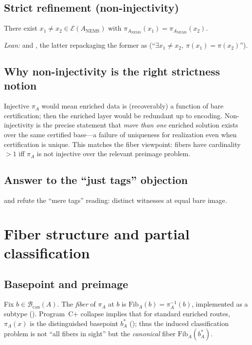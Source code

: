 \documentclass[11pt]{article}
\begin{document}
\subsection{Strict refinement (non-injectivity)}\label{sec:strict-refinement-thm}
\begin{theorem}\label{thm:strict-refinement}
There exist $x_1 \neq x_2 \in \mathcal{E}(A_{\mathrm{NEMS}})$ with $\pi_{A_{\mathrm{NEMS}}}(x_1) = \pi_{A_{\mathrm{NEMS}}}(x_2)$.
\end{theorem}

\noindent\emph{Lean:}  and , the latter repackaging the former as  (``$\exists x_1 \neq x_2,\ \pi(x_1)=\pi(x_2)$'').

\subsection{Why non-injectivity is the right strictness notion}\label{sec:strict-refinement-why}
Injective $\pi_A$ would mean enriched data is (recoverably) a function of bare certification; then the enriched layer would be redundant up to encoding. Non-injectivity is the precise statement that \emph{more than one} enriched solution exists over the same certified base---a failure of uniqueness for realization even when certification is unique. This matches the fiber viewpoint: fibers have cardinality $>1$ iff $\pi_A$ is not injective over the relevant preimage problem.

\subsection{Answer to the ``just tags'' objection}\label{sec:strict-refinement-meaning}
 and  refute the ``mere tags'' reading: distinct witnesses at equal bare image.

\section{Fiber structure and partial classification}\label{sec:fiber-structure}

\subsection{Basepoint and preimage}\label{sec:fiber-structure-lang}
Fix $b \in \mathcal{B}_{\mathrm{can}}(A)$. The \emph{fiber} of $\pi_A$ at $b$ is $\mathrm{Fib}_A(b)=\pi_A^{-1}(b)$, implemented as a subtype (). Program~C+ collapse implies that for standard enriched routes, $\pi_A(x)$ is the distinguished basepoint $b^\ast_A$ (); thus the induced classification problem is not ``all fibers in sight'' but the \emph{canonical} fiber $\mathrm{Fib}_A(b^\ast_A)$.
\end{document}

